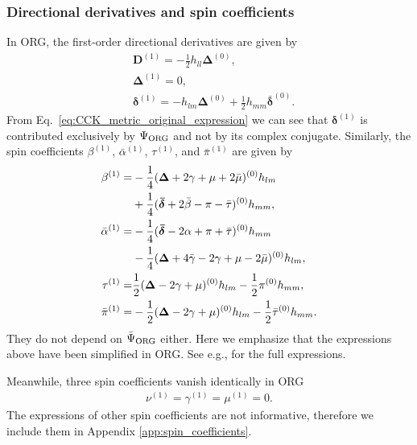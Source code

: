\documentclass[aps,prd,amsmath,floats,floatfix, twocolumn,
superscriptaddress,nofootinbib,showpacs]{revtex4-1}
\newcommand{\hertz}{\Psi_{\rm ORG}}
\newcommand{\hertzbar}{\bar{\Psi}_{\rm ORG}}
\begin{document}
\subsubsection{Directional derivatives and spin coefficients}
\label{subsubsec:reconstruction_sc_dd}
In ORG, the first-order directional derivatives are given by \cite{Campanelli:1998jv}
\begin{subequations}
\begin{align}
    &\bm{D}^{(1)}=-\frac{1}{2}h_{ll}\bm{\Delta}^{(0)}, \\
    &\bm{\Delta}^{(1)}=0, \\
    &\bm{\delta}^{(1)}=-h_{lm}\bm{\Delta}^{(0)}+\frac{1}{2}h_{mm}\bm{\bar{\delta}}^{(0)}. \label{eq:directional_derivatives_delta1}
\end{align}
\end{subequations}
From Eq.~\eqref{eq:CCK_metric_original_expression} we can see that $\bm{\delta}^{(1)}$ is contributed exclusively by $\hertz$ and not by its complex conjugate. Similarly, the spin coefficients $\beta^{(1)}$, $\bar{\alpha}^{(1)}$, $\tau^{(1)}$, and $\bar{\pi}^{(1)}$ are given by \cite{Campanelli:1998jv}
\begin{subequations}
\begin{align}
    \beta^{(1)}=&-\frac{1}{4}(\bm{\Delta}+2\gamma+\mu+2\bar{\mu})^{(0)}h_{lm}\notag \\
    &+\frac{1}{4}(\bm{\bar{\delta}}+2\bar{\beta}-\pi-\bar{\tau})^{(0)}h_{mm}, \notag \\
    \bar{\alpha}^{(1)}=&-\frac{1}{4}(\bm{\bar{\delta}}-2\alpha+\pi+\bar{\tau})^{(0)}h_{mm}\notag \notag \\
    &-\frac{1}{4}(\bm{\Delta}+4\bar{\gamma}-2\gamma+\mu-2\bar{\mu})^{(0)}h_{lm}, \notag \\
    \tau^{(1)}=&\frac{1}{2}(\bm{\Delta}-2\gamma+\mu)^{(0)}h_{lm}-\frac{1}{2}\pi^{(0)} h_{mm},\notag \\
    \bar{\pi}^{(1)}=&-\frac{1}{2}(\bm{\Delta}-2\gamma+\mu)^{(0)}h_{lm}-\frac{1}{2}\bar{\tau}^{(0)} h_{mm}.\notag
\end{align}
\end{subequations}
They do not depend on $\hertzbar$ either. Here we emphasize that the expressions above have been simplified in ORG. See e.g., \cite{Loutrel:2020wbw} for the full expressions.

Meanwhile, three spin coefficients vanish identically in ORG  \cite{Campanelli:1998jv}
\begin{align}
    \nu^{(1)}=\gamma^{(1)}=\mu^{(1)}=0.
\end{align}
The expressions of other spin coefficients are not informative, therefore we include them in Appendix \ref{app:spin_coefficients}.
\end{document}
